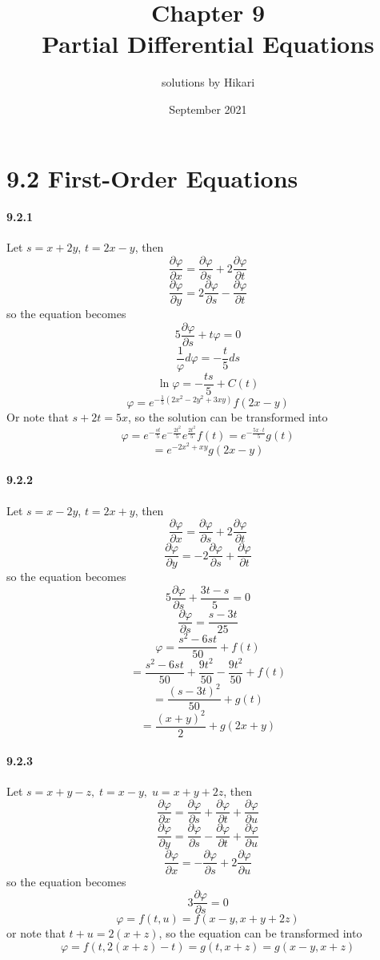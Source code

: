 \documentclass[a4paper]{article}
\title{Chapter 9\\Partial Differential Equations}
\author{solutions by Hikari}
\date{September 2021}
\begin{document}
\newcommand{\pdv}[2]{\frac{\partial#1}{\partial#2}}
\newcommand{\V}{\mathbf}

\maketitle

\section*{9.2 First-Order Equations}

\paragraph{9.2.1}
Let $s=x+2y$, $t=2x-y$, then
\[
\pdv{\varphi}{x}=\pdv{\varphi}{s}+2\pdv{\varphi}{t}
\]
\[
\pdv{\varphi}{y}=2\pdv{\varphi}{s}-\pdv{\varphi}{t}
\]
so the equation becomes
\[
5\pdv{\varphi}{s}+t\varphi=0
\]
\[
\frac{1}{\varphi}d\varphi=-\frac{t}{5}ds
\]
\[
\ln\varphi=-\frac{ts}{5}+C(t)
\]
\[
\varphi=e^{-\frac{1}{5}(2x^2-2y^2+3xy)}f(2x-y)
\]
Or note that $s+2t=5x$, so the solution can be transformed into
\[
\varphi=e^{-\frac{st}{5}}e^{-\frac{2t^2}{5}}e^{\frac{2t^2}{5}}f(t)
=e^{-\frac{5x\cdot t}{5}}g(t)
\]
\[
=e^{-2x^2+xy}g(2x-y)
\]

\paragraph{9.2.2}
Let $s=x-2y$, $t=2x+y$, then 
\[
\pdv{\varphi}{x}=\pdv{\varphi}{s}+2\pdv{\varphi}{t}
\]
\[
\pdv{\varphi}{y}=-2\pdv{\varphi}{s}+\pdv{\varphi}{t}
\]
so the equation becomes 
\[
5\pdv{\varphi}{s}+\frac{3t-s}{5}=0
\]
\[
\pdv{\varphi}{s}=\frac{s-3t}{25}
\]
\[
\varphi=\frac{s^2-6st}{50}+f(t)
\]
\[
=\frac{s^2-6st}{50}+\frac{9t^2}{50}-\frac{9t^2}{50}+f(t)
\]
\[
=\frac{(s-3t)^2}{50}+g(t)
\]
\[
=\frac{(x+y)^2}{2}+g(2x+y)
\]

\paragraph{9.2.3}
Let $s=x+y-z,\;t=x-y,\;u=x+y+2z$, then
\[
\pdv{\varphi}{x}=\pdv{\varphi}{s}+\pdv{\varphi}{t}+\pdv{\varphi}{u}
\]
\[
\pdv{\varphi}{y}=\pdv{\varphi}{s}-\pdv{\varphi}{t}+\pdv{\varphi}{u}
\]
\[
\pdv{\varphi}{x}=-\pdv{\varphi}{s}+2\pdv{\varphi}{u}
\]
so the equation becomes
\[
3\pdv{\varphi}{s}=0
\]
\[
\varphi=f(t,u)=f(x-y,x+y+2z)\]
or note that $t+u=2(x+z)$, so the equation can be transformed into
\[
\varphi=f(t,2(x+z)-t)=g(t,x+z)=g(x-y,x+z)
\]
\end{document}
